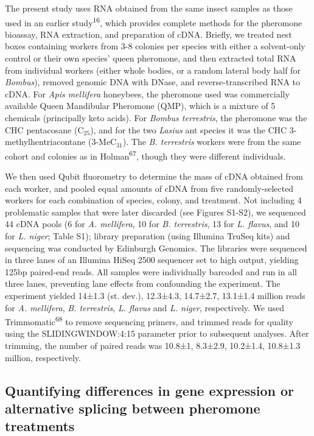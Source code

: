 \documentclass[12pt,]{article}
\begin{document}
The present study uses RNA obtained from the same insect samples as
those used in an earlier study\textsuperscript{16}, which provides
complete methods for the pheromone bioassay, RNA extraction, and
preparation of cDNA. Briefly, we treated nest boxes containing workers
from 3-8 colonies per species with either a solvent-only control or
their own species' queen pheromone, and then extracted total RNA from
individual workers (either whole bodies, or a random lateral body half
for \emph{Bombus}), removed genomic DNA with DNase, and
reverse-transcribed RNA to cDNA. For \emph{Apis mellifera} honeybees,
the pheromone used was commercially available Queen Mandibular Pheromone
(QMP), which is a mixture of 5 chemicals (principally keto acids). For
\emph{Bombus terrestris}, the pheromone was the CHC pentacosane
(C\(_{25}\)), and for the two \emph{Lasius} ant species it was the CHC
3-methylhentriacontane (3-MeC\(_{31}\)). The \emph{B. terrestris}
workers were from the same cohort and colonies as in
Holman\textsuperscript{67}, though they were different individuals.

We then used Qubit fluorometry to determine the mass of cDNA obtained
from each worker, and pooled equal amounts of cDNA from five
randomly-selected workers for each combination of species, colony, and
treatment. Not including 4 problematic samples that were later discarded
(see Figures S1-S2), we sequenced 44 cDNA pools (6 for \emph{A.
mellifera}, 10 for \emph{B. terrestris}, 13 for \emph{L. flavus}, and 10
for \emph{L. niger}; Table S1); library preparation (using Illumina
TruSeq kits) and sequencing was conducted by Edinburgh Genomics. The
libraries were sequenced in three lanes of an Illumina HiSeq 2500
sequencer set to high output, yielding 125bp paired-end reads. All
samples were individually barcoded and run in all three lanes,
preventing lane effects from confounding the experiment. The experiment
yielded 14±1.3 (st. dev.), 12.3±4.3, 14.7±2.7, 13.1±1.4 million reads
for \emph{A. mellifera}, \emph{B. terrestris}, \emph{L. flavus} and
\emph{L. niger}, respectively. We used Trimmomatic\textsuperscript{68}
to remove sequencing primers, and trimmed reads for quality using the
SLIDINGWINDOW:4:15 parameter prior to subsequent analyses. After
trimming, the number of paired reads was 10.8±1, 8.3±2.9, 10.2±1.4,
10.8±1.3 million, respectively.

\subsection{Quantifying differences in gene expression or alternative
splicing between pheromone
treatments}\label{quantifying-differences-in-gene-expression-or-alternative-splicing-between-pheromone-treatments}
\end{document}
